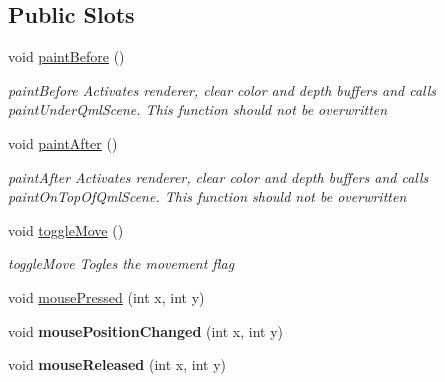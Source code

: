 \subsection*{Public Slots}
\begin{DoxyCompactItemize}
\item 
\mbox{\label{class_g_l_item_a1b613d9ef12ba94771b505798170c6e9}} 
void \mbox{\hyperlink{class_g_l_item_a1b613d9ef12ba94771b505798170c6e9}{paint\+Before}} ()
\begin{DoxyCompactList}\small\item\em paint\+Before Activates renderer, clear color and depth buffers and calls paint\+Under\+Qml\+Scene. This function should not be overwritten \end{DoxyCompactList}\item 
\mbox{\label{class_g_l_item_a146bd63e186b55cbd6ed192706773a24}} 
void \mbox{\hyperlink{class_g_l_item_a146bd63e186b55cbd6ed192706773a24}{paint\+After}} ()
\begin{DoxyCompactList}\small\item\em paint\+After Activates renderer, clear color and depth buffers and calls paint\+On\+Top\+Of\+Qml\+Scene. This function should not be overwritten \end{DoxyCompactList}\item 
\mbox{\label{class_g_l_item_acd4f1c0f42402d1cb09e83f1051703cc}} 
void \mbox{\hyperlink{class_g_l_item_acd4f1c0f42402d1cb09e83f1051703cc}{toggle\+Move}} ()
\begin{DoxyCompactList}\small\item\em toggle\+Move Togles the movement flag \end{DoxyCompactList}\item 
void \mbox{\hyperlink{class_g_l_item_aba4710ee3d504c893e493a2a9f48efd0}{mouse\+Pressed}} (int x, int y)
\item 
\mbox{\label{class_g_l_item_a52831365074bd5d082de828755ee8954}} 
void {\bfseries mouse\+Position\+Changed} (int x, int y)
\item 
\mbox{\label{class_g_l_item_aca75d031f39c19b86c69042bd39c127a}} 
void {\bfseries mouse\+Released} (int x, int y)
\item 
\mbox{\label{class_g_l_item_afe9282e5b6619800867b757504b036f8}} 

\end{DoxyCompactItemize}
